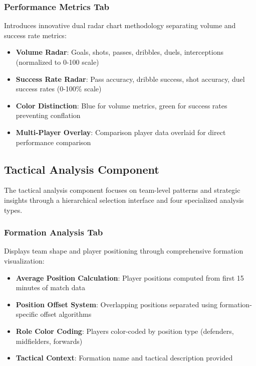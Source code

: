 \documentclass[12pt,a4paper]{article}
\begin{document}
\subsubsection{Performance Metrics Tab}
Introduces innovative dual radar chart methodology separating volume and success rate metrics:
\begin{itemize}
    \item \textbf{Volume Radar}: Goals, shots, passes, dribbles, duels, interceptions (normalized to 0-100 scale)
    \item \textbf{Success Rate Radar}: Pass accuracy, dribble success, shot accuracy, duel success rates (0-100\% scale)
    \item \textbf{Color Distinction}: Blue for volume metrics, green for success rates preventing conflation
    \item \textbf{Multi-Player Overlay}: Comparison player data overlaid for direct performance comparison
\end{itemize}



\subsection{Tactical Analysis Component}

The tactical analysis component focuses on team-level patterns and strategic insights through a hierarchical selection interface and four specialized analysis types.

\subsubsection{Formation Analysis Tab}
Displays team shape and player positioning through comprehensive formation visualization:
\begin{itemize}
    \item \textbf{Average Position Calculation}: Player positions computed from first 15 minutes of match data
    \item \textbf{Position Offset System}: Overlapping positions separated using formation-specific offset algorithms
    \item \textbf{Role Color Coding}: Players color-coded by position type (defenders, midfielders, forwards)
    \item \textbf{Tactical Context}: Formation name and tactical description provided
\end{itemize}
\end{document}
